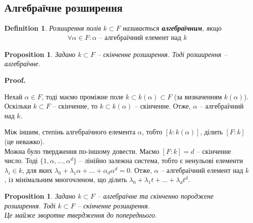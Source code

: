 \documentclass[a4paper, 10pt]{article}
\makeatletter
\theoremstyle{theoremdd}
\theoremstyle{theoremdd}
\newtheorem{definition}[theorem]{Definition}
\theoremstyle{theoremdd}
\theoremstyle{theoremdd}
\theoremstyle{theoremdd}
\theoremstyle{theoremdd}
\theoremstyle{theoremdd}
\theoremstyle{theoremdd}
\theoremstyle{theoremdd}
\newtheorem{proposition}[theorem]{Proposition}
\theoremstyle{theoremdd}
\theoremstyle{theoremdd}
\theoremstyle{theoremdd}
\theoremstyle{theoremdd}
\theoremstyle{theoremdd}
\theoremstyle{theoremdd}
\renewenvironment{proof}[1][Proof.\\]{\par
\pushQED{\hfill \qed}%
\normalfont \topsep6\p@\@plus6\p@\relax
\trivlist
\item\relax
{\bfseries
#1\@addpunct{.}}\hspace\labelsep\ignorespaces
}{%
\popQED\endtrivlist\@endpefalse
}
\makeatother
\begin{document}
\subsection{Алгебраїчне розширення}
\begin{definition}
Розширення полів $k \subset F$ називається \textbf{алгебраїчним}, якщо
\begin{align*}
\forall \alpha \in F: \alpha \text{ -- алгебраїчний елемент над }k
\end{align*}
\end{definition}

\begin{proposition}
Задано $k \subset F$ -- скінченне розширення. Тоді розширення -- алгебраїчне.
\end{proposition}

\begin{proof}
Нехай $\alpha \in F$, тоді маємо проміжне поле $k \subset k(\alpha) \subset F$ (за визначенням $k(\alpha)$). Оскільки $k \subset F$ -- скінченне, то $k \subset k(\alpha)$ -- скінченне. Отже, $\alpha$ -- алгебраїчний над $k$.
\end{proof}

Між іншим, степінь алгебраїчного елемента $\alpha$, тобто $[k:k(\alpha)]$, ділить $[F:k]$ (це неважко).
\bigskip \\
Можна було твердження по-іншому довести. Маємо $[F:k] = d$ -- скінченне число. Тоді $\{1,\alpha,\dots,\alpha^d\}$ -- лінійно залежна система, тобто є ненульові елементи $\lambda_i \in k$, для яких $\lambda_0 + \lambda_1 \alpha + \dots + \alpha_d \alpha^d = 0$. Отже, $\alpha$ -- алгебраїчний елемент над $k$, із мінімальним многочленом, що ділить $\lambda_0 + \lambda_1 t + \dots + \lambda_d t^d$.

\begin{proposition}
Задано $k \subset F$ -- алгебраїчне та скінченно породжене розширення. Тоді $k \subset F$ -- скінченне розширення.\\
\textit{Це майже зворотне твердження до попереднього.}
\end{proposition}
\end{document}
